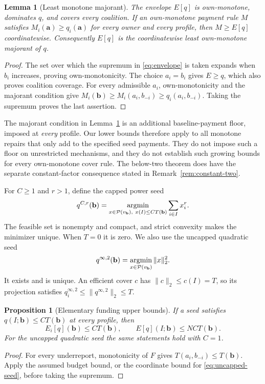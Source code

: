 \documentclass[11pt]{article}
\newtheorem{lemma}[theorem]{Lemma}
\newtheorem{proposition}[theorem]{Proposition}
\theoremstyle{definition}
\theoremstyle{remark}
\begin{document}
\begin{lemma}[Least monotone majorant]
\label{lem:least-majorant}
The envelope $E[q]$ is own-monotone, dominates $q$, and covers every
coalition.  If an own-monotone payment rule $M$ satisfies
$M_i(\mathbf a)\ge q_i(\mathbf a)$ for every owner and every profile, then
$M\ge E[q]$ coordinatewise.  Consequently $E[q]$ is the coordinatewise
least own-monotone majorant of $q$.
\end{lemma}
\begin{proof}
The set over which the supremum in \eqref{eq:envelope} is taken expands
when $b_i$ increases, proving own-monotonicity.  The choice $a_i=b_i$
gives $E\ge q$, which also proves coalition coverage.  For every admissible
$a_i$, own-monotonicity and the majorant condition give
$M_i(\mathbf b)\ge M_i(a_i,b_{-i})\ge q_i(a_i,b_{-i})$.
Taking the supremum proves the last assertion.
\end{proof}

The majorant condition in Lemma~\ref{lem:least-majorant} is an additional
baseline-payment floor, imposed at \emph{every} profile.  Our lower bounds
therefore apply to all monotone repairs that only add to the specified
seed payments.  They do not impose such a floor on unrestricted mechanisms,
and they do not establish such growing bounds for every own-monotone cover rule.
The below-two theorem does have the separate constant-factor consequence
stated in Remark~\ref{rem:constant-two}.

For $C\ge1$ and $r>1$, define the capped power seed
\begin{equation}
 q^{C,r}(\mathbf b)=
 \mathop{\rm argmin}_{x\in\mathcal P(v_{\mathbf b}),\ x(I)\le C T(\mathbf b)}
       \sum_{i\in I}x_i^r.
 \label{eq:capped-seed}
\end{equation}
The feasible set is nonempty and compact, and strict convexity makes the
minimizer unique.  When $T=0$ it is zero.  We also use the uncapped quadratic
seed
\begin{equation}
 q^{\infty,2}(\mathbf b)=\mathop{\rm argmin}_{x\in\mathcal P(v_{\mathbf b})}
       \|x\|_2^2.
 \label{eq:uncapped-seed}
\end{equation}
It exists and is unique.  An efficient cover $c$ has
$\|c\|_2\le c(I)=T$, so its projection satisfies
$q_i^{\infty,2}\le\|q^{\infty,2}\|_2\le T$.

\begin{proposition}[Elementary funding upper bounds]
\label{prop:trivial-upper}
If a seed satisfies $q(I;\mathbf b)\le C T(\mathbf b)$ at every profile,
then
\[
 E_i[q](\mathbf b)\le C T(\mathbf b),\qquad
 E[q](I;\mathbf b)\le NC T(\mathbf b).
\]
For the uncapped quadratic seed the same statements hold with $C=1$.
\end{proposition}
\begin{proof}
For every underreport, monotonicity of $F$ gives
$T(a_i,b_{-i})\le T(\mathbf b)$.  Apply the assumed budget bound, or the
coordinate bound for \eqref{eq:uncapped-seed}, before taking the supremum.
\end{proof}
\end{document}
